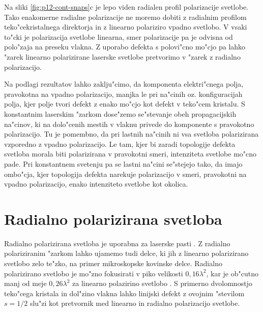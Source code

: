 \documentclass[12pt,twoside,openright,final]{report}
\begin{document}
Na sliki \ref{fig:p12-cont-snaps}c je lepo viden radialen profil polarizacije svetlobe. 
Tako enakomerne radialne polarizacije ne moremo dobiti z radialnim profilom teko"cekristalnega direktorja in z linearno polariziro vpadno svetlobo. 
V vsaki to"cki je polarizacija svetlobe linearna, smer polarizacije pa je odvisna od polo"zaja na preseku vlakna. 
Z uporabo defekta s polovi"cno mo"cjo pa lahko "zarek linearno polarizirane laserske svetlobe pretvorimo v "zarek z radialno polarizacijo. 

Na podlagi rezultatov lahko zaklju"cimo, da komponenta elektri"cnega polja, pravokotna na vpadno polarizacijo, manjka le pri na"cinih oz. konfiguracijah polja, kjer polje tvori defekt z enako mo"cjo kot defekt v teko"cem kristalu. 
S konstantnim laserskim "zarkom dose"zemo se"stevanje obeh propagacijskih na"cinov, ki na dolo"cenih mestih v vlaknu privede do komponente s pravokotno polarizacijo. 
Tu je pomembno, da pri lastnih na"cinih ni vsa svetloba polarizirana vzporedno z vpadno polarizacijo.
Le tam, kjer bi zaradi topologije defekta svetloba morala biti polarizirana v pravokotni smeri, intenziteta svetlobe mo"cno pade. 
Pri konstantnem svetenju pa se lastni na"cini se"stejejo tako, da imajo ombo"cja, kjer topologija defekta narekuje polarizacijo v smeri, pravokotni na vpadno polarizacijo, enako intenziteto svetlobe kot okolica. 

\section{Radialno polarizirana svetloba}
Radialno polarizirana svetloba je uporabna za laserske pasti \cite{radial-trap}.
Z radialno polariziranim "zarkom lahko ujamemo tudi delce, ki jih z linearno polarizirano svetlobo zelo te"zko, na primer mikroskopske kovinske delce.
Radialno polarizirano svetlobo je mo"zno fokusirati v piko velikosti $0,\!16\lambda^2$, kar je ob"cutno manj od meje $0,\!26\lambda^2$ za linearno polazirino svetlobo \cite{radial-focus, kozawa-sato-focal-spot}. 
S primerno dvolomnostjo teko"cega kristala in dol"zino vlakna lahko linijski defekt z ovojnim "stevilom $s=1/2$ slu"zi kot pretvornik med linearno in radialno polarizacijo svetlobe. 
\end{document}
